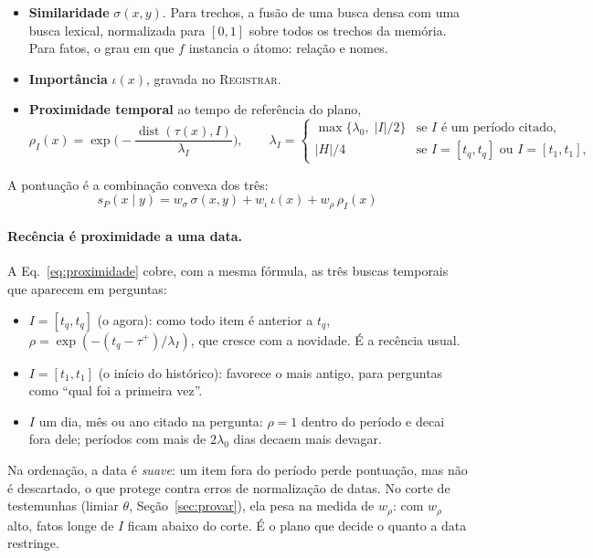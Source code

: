 \documentclass[11pt]{article}
\theoremstyle{definition}
\theoremstyle{plain}
\newcommand{\op}[1]{\textsc{#1}}
\newcommand{\dist}{\operatorname{dist}}
\begin{document}
\begin{itemize}[leftmargin=*,itemsep=2pt]
\item \textbf{Similaridade} $\sigma(x,y)$. Para trechos, a fusão de uma busca
  densa com uma busca lexical, normalizada para $[0,1]$ sobre todos os trechos
  da memória.
  Para fatos, o grau em que $f$ instancia o átomo: relação e nomes.
\item \textbf{Importância} $\iota(x)$, gravada no \op{Registrar}.
\item \textbf{Proximidade temporal} ao tempo de referência do plano,
\begin{equation}
\label{eq:proximidade}
\rho_I(x)=\exp\!\Big(-\frac{\dist(\tau(x),I)}{\lambda_I}\Big),
\qquad
\lambda_I=
\begin{cases}
\max\{\lambda_0,\;|I|/2\} & \text{se } I \text{ é um período citado},\\
|H|/4 & \text{se } I=[t_q,t_q] \text{ ou } I=[t_1,t_1],
\end{cases}
\end{equation}
\end{itemize}

\noindent A pontuação é a combinação convexa dos três:
\begin{equation}
\label{eq:pontuacao}
\boxed{\;s_P(x\mid y)=w_\sigma\,\sigma(x,y)+w_\iota\,\iota(x)+w_\rho\,\rho_I(x)\;}
\end{equation}

\paragraph{Recência é proximidade a uma data.} A Eq.~\eqref{eq:proximidade}
cobre, com a mesma fórmula, as três buscas temporais que aparecem em
perguntas:
\begin{itemize}[leftmargin=*,itemsep=1pt]
\item $I=[t_q,t_q]$ (o agora): como todo item é anterior a $t_q$,
  $\rho=\exp(-(t_q-\tau^+)/\lambda_I)$, que cresce com a novidade. É a
  recência usual.
\item $I=[t_1,t_1]$ (o início do histórico): favorece o mais antigo, para
  perguntas como ``qual foi a primeira vez''.
\item $I$ um dia, mês ou ano citado na pergunta: $\rho=1$ dentro do período e
  decai fora dele; períodos com mais de $2\lambda_0$ dias decaem mais devagar.
\end{itemize}
Na ordenação, a data é \emph{suave}: um item fora do período perde pontuação,
mas não é descartado, o que protege contra erros de normalização de datas. No
corte de testemunhas (limiar $\theta$, Seção~\ref{sec:provar}), ela pesa na
medida de $w_\rho$: com $w_\rho$ alto, fatos longe de $I$ ficam abaixo do
corte. É o plano que decide o quanto a data restringe.
\end{document}
